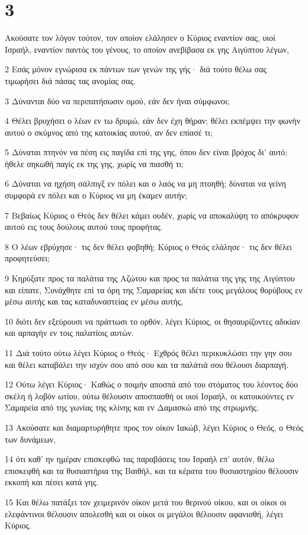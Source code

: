 \chapter{3}

\par Ακούσατε τον λόγον τούτον, τον οποίον ελάλησεν ο Κύριος εναντίον σας, υιοί Ισραήλ, εναντίον παντός του γένους, το οποίον ανεβίβασα εκ γης Αιγύπτου λέγων,
\par 2 Εσάς μόνον εγνώρισα εκ πάντων των γενών της γής· διά τούτο θέλω σας τιμωρήσει διά πάσας τας ανομίας σας.
\par 3 Δύνανται δύο να περιπατήσωσιν ομού, εάν δεν ήναι σύμφωνοι;
\par 4 Θέλει βρυχήσει ο λέων εν τω δρυμώ, εάν δεν έχη θήραν; θέλει εκπέμψει την φωνήν αυτού ο σκύμνος από της κατοικίας αυτού, αν δεν επίασέ τι;
\par 5 Δύναται πτηνόν να πέση εις παγίδα επί της γης, όπου δεν είναι βρόχος δι' αυτό; ήθελε σηκωθή παγίς εκ της γης, χωρίς να πιασθή τι;
\par 6 Δύναται να ηχήση σάλπιγξ εν πόλει και ο λαός να μη πτοηθή; δύναται να γείνη συμφορά εν πόλει και ο Κύριος να μη έκαμεν αυτήν;
\par 7 Βεβαίως Κύριος ο Θεός δεν θέλει κάμει ουδέν, χωρίς να αποκαλύψη το απόκρυφον αυτού εις τους δούλους αυτού τους προφήτας.
\par 8 Ο λέων εβρύχησε· τις δεν θέλει φοβηθή; Κύριος ο Θεός ελάλησε· τις δεν θέλει προφητεύσει;
\par 9 Κηρύξατε προς τα παλάτια της Αζώτου και προς τα παλάτια της γης της Αιγύπτου και είπατε, Συνάχθητε επί τα όρη της Σαμαρείας και ιδέτε τους μεγάλους θορύβους εν μέσω αυτής και τας καταδυναστείας εν μέσω αυτής,
\par 10 διότι δεν εξεύρουσι να πράττωσι το ορθόν, λέγει Κύριος, οι θησαυρίζοντες αδικίαν και αρπαγήν εν τοις παλατίοις αυτών.
\par 11 Διά τούτο ούτω λέγει Κύριος ο Θεός· Εχθρός θέλει περικυκλώσει την γην σου και θέλει καταβάλει την ισχύν σου από σου και τα παλάτιά σου θέλουσι διαρπαγή.
\par 12 Ούτω λέγει Κύριος· Καθώς ο ποιμήν αποσπά από του στόματος του λέοντος δύο σκέλη ή λοβόν ωτίου, ούτω θέλουσιν αποσπασθή οι υιοί Ισραήλ, οι κατοικούντες εν Σαμαρεία από της γωνίας της κλίνης και εν Δαμασκώ από της στρωμνής.
\par 13 Ακούσατε και διαμαρτυρήθητε προς τον οίκον Ιακώβ, λέγει Κύριος ο Θεός, ο Θεός των δυνάμεων,
\par 14 ότι καθ' ην ημέραν επισκεφθώ τας παραβάσεις του Ισραήλ επ' αυτόν, θέλω επισκεφθή και τα θυσιαστήρια της Βαιθήλ, και τα κέρατα του θυσιαστηρίου θέλουσιν εκκοπή και πέσει κατά γης.
\par 15 Και θέλω πατάξει τον χειμερινόν οίκον μετά του θερινού οίκου, και οι οίκοι οι ελεφάντινοι θέλουσιν απολεσθή και οι οίκοι οι μεγάλοι θέλουσιν αφανισθή, λέγει Κύριος.


